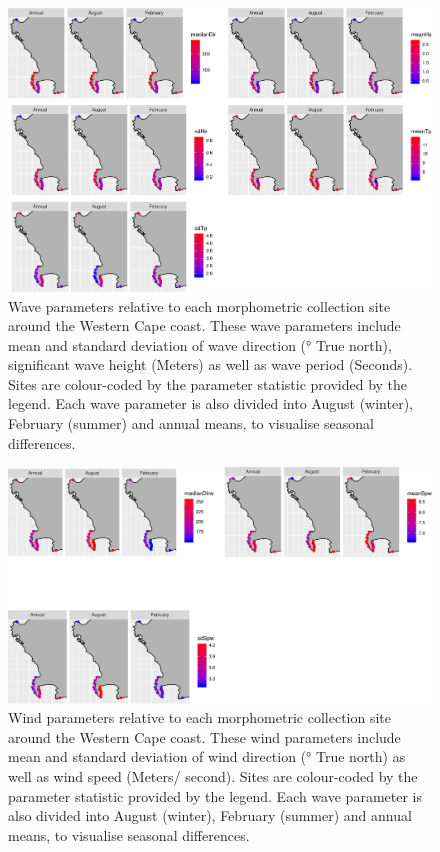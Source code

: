 \documentclass[10pt,a4,]{article}
\makeatletter
\def\maxwidth{\ifdim\Gin@nat@width>\linewidth\linewidth
\else\Gin@nat@width\fi}
\let\Oldincludegraphics\includegraphics
\renewcommand{\includegraphics}[1]{\Oldincludegraphics[width=\maxwidth]{#1}}
\makeatother
\begin{document}
\begin{figure}
\centering
\includegraphics{chapter_2_files/figure-latex/unnamed-chunk-15-1.pdf}
\caption{Wave parameters relative to each morphometric collection site
around the Western Cape coast. These wave parameters include mean and
standard deviation of wave direction (° True north), significant wave
height (Meters) as well as wave period (Seconds). Sites are colour-coded
by the parameter statistic provided by the legend. Each wave parameter
is also divided into August (winter), February (summer) and annual
means, to visualise seasonal differences.}
\end{figure}

\begin{figure}
\centering
\includegraphics{chapter_2_files/figure-latex/unnamed-chunk-16-1.pdf}
\caption{Wind parameters relative to each morphometric collection site
around the Western Cape coast. These wind parameters include mean and
standard deviation of wind direction (° True north) as well as wind
speed (Meters/ second). Sites are colour-coded by the parameter
statistic provided by the legend. Each wave parameter is also divided
into August (winter), February (summer) and annual means, to visualise
seasonal differences.}
\end{figure}
\end{document}

